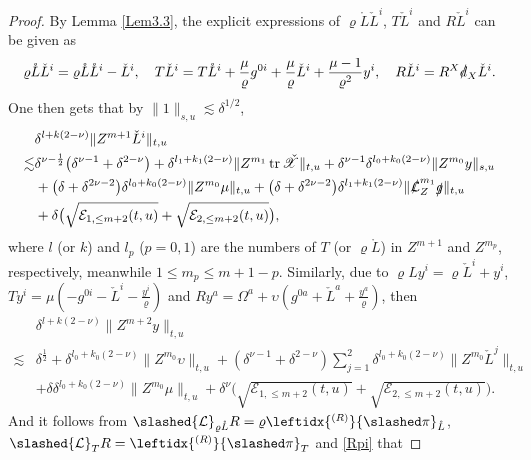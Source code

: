 \documentclass[11pt,twoside]{article}
\def\f{\frac}
\begin{document}
\begin{proof}
By Lemma \ref{Lem3.3}, the explicit expressions of $\varrho\mathring{L}\check{L}^i$, $T\check{L}^i$ and $R\check{L}^i$
can be given as
\[
\varrho\mathring{L}\check{L}^i = \varrho\mathring{L}\mathring{L}^i - \check{L}^i,
\quad
T\check{L}^i = T\mathring{L}^i + \frac{\mu}{\varrho}g^{0i} + \frac{\mu}{\varrho}\check{L}^i + \frac{\mu-1}{\varrho^2}y^i,
\quad
R\check{L}^i = {R^X}\slashed{d}_X\check{L}^i.
\]
One then gets that by $\|1\|_{s,u}\lesssim\delta^{1/2}$,
\begin{equation}\label{ZkL}
\begin{split}
&\delta^{l+k(2-\nu)} \| Z^{m+1}\check{L}^i \|_{t,u} \\
\lesssim&\delta^{\nu-\frac{1}{2}} \bigl( \delta^{\nu-1} + \delta^{2-\nu} \bigr)
+ \delta^{l_1+k_1(2-\nu)} \| Z^{m_1} \operatorname{tr}\check{\mathscr{X}} \|_{t,u} + \delta^{\nu-1} \delta^{l_0+k_0(2-\nu)} \| Z^{m_0}y \|_{s,u}\\
&+ \bigl( \delta + \delta^{2\nu-2} \bigr) \delta^{l_0+k_0(2-\nu)} \| Z^{m_0}\mu \|_{t,u} + \bigl( \delta + \delta^{2\nu-2} \bigr) \delta^{l_1+k_1(2-\nu)} \| \slashed{\mathcal{L}}_Z^{m_1}\slashed{g} \|_{t,u} \\
&+ \delta \big( \sqrt{\mathcal{E}_{1,\leq m+2}(t,u)} + \sqrt{\mathcal{E}_{2,\leq m+2}(t,u)} \big),
\end{split}
\end{equation}
where $l$ (or $k$) and $l_p$ ($p=0,1$) are the numbers of $T$ (or $\varrho\mathring{L}$) in $Z^{m+1}$ and $Z^{m_p}$, respectively,
meanwhile $1 \leq m_p \leq m+1-p$.
Similarly, due to $\varrho Ly^i=\varrho\check L^i+y^i$, $Ty^i=\mu(-g^{0i}-\check L^i-\f{y^i}\varrho)$ and $Ry^a=\Omega^a+\upsilon(g^{0a}+\check L^a+\f{y^a}\varrho)$, then
\begin{equation}\label{Zkx}
\begin{split}
&\delta^{l+k(2-\nu)}\|Z^{m+2}y\|_{t,u}\\
\lesssim&\delta^{\f12}+\delta^{l_0+k_0(2-\nu)}\|Z^{m_0}\upsilon\|_{t,u}
+(\delta^{\nu-1}+\delta^{2-\nu})\sum_{j=1}^2\delta^{l_0+k_0(2-\nu)}\|Z^{m_0}\check L^j\|_{t,u}\\
&+\delta\delta^{l_{0}+k_0(2-\nu)}\|Z^{m_{0}}\mu\|_{t,u}+\delta^{\nu}\big( \sqrt{\mathcal{E}_{1,\leq m+2}(t,u)} + \sqrt{\mathcal{E}_{2,\leq m+2}(t,u)} \big).
\end{split}
\end{equation}
And it follows from $\slashed{\mathcal L}_{\varrho\mathring L}R=\varrho\leftidx{^{(R)}}{\slashed\pi}_{\mathring L}$, $\slashed{\mathcal L}_TR=\leftidx{^{(R)}}{\slashed\pi}_T$ and \eqref{Rpi} that

\end{proof}
\end{document}
